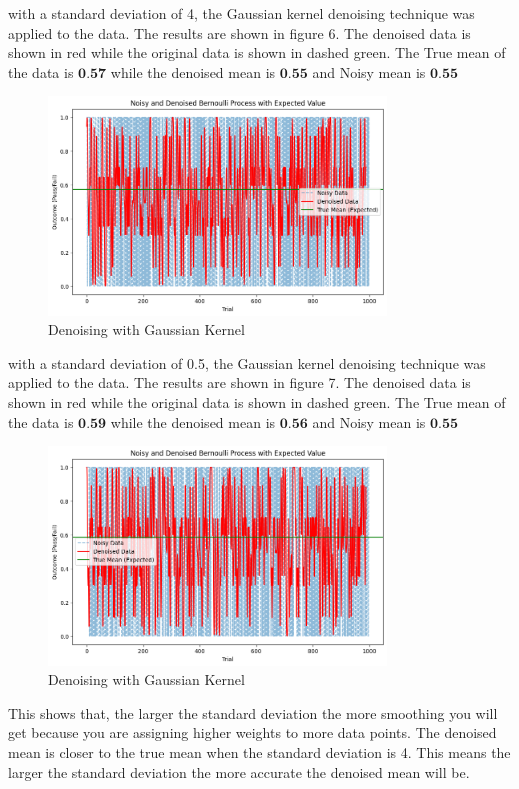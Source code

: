 \documentclass[a4paper,12pt]{article} %
\begin{document}
\clearpage
with a standard deviation of 4, the Gaussian kernel denoising technique was applied to the data. The results are shown in figure 6. The denoised data is shown in red while the original data is shown in dashed green. The True mean of the data is \(\textbf{0.57}\) while the denoised mean is \(\textbf{0.55}\) and Noisy mean is \(\textbf{0.55}\)
\begin{figure}[h]
\centering
\includegraphics[width=0.8\textwidth]{gaussian_4.png}
\caption{Denoising with Gaussian Kernel}
\end{figure}
\clearpage
with a standard deviation of 0.5, the Gaussian kernel denoising technique was applied to the data. The results are shown in figure 7. The denoised data is shown in red while the original data is shown in dashed green. The True mean of the data is \(\textbf{0.59}\) while the denoised mean is \(\textbf{0.56}\) and Noisy mean is \(\textbf{0.55}\)
\begin{figure}[h]
\centering
\includegraphics[width=0.8\textwidth]{gaussian_0.5.png}
\caption{Denoising with Gaussian Kernel}
\end{figure}
This shows that, the larger the standard deviation the more smoothing you will get because you are assigning higher weights to more data points. The denoised mean is closer to the true mean when the standard deviation is 4. This means the larger the standard deviation the more accurate the denoised mean will be.
\end{document}
